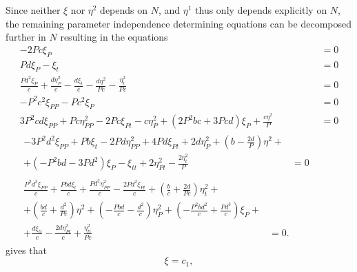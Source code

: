 Since neither \(\xi\) nor \(\eta^2\) depends on \(N\), and \(\eta^1\) thus only depends explicitly on \(N\), the remaining parameter independence determining equations  can be decomposed further in \(N\) resulting in the equations
\begin{subequations}
  \begin{align}
    - 2 P c \xi_{P} &= 0 \label{eq:lotka-volterra-det-aN-a}\\
    P d \xi_{P} - \xi_{t} &= 0 \label{eq:lotka-volterra-det-aN-b}\\
    \frac{P d^{2} \xi_{P}}{c} + \frac{d \eta^2_{P}}{c} - \frac{d \xi_{t}}{c} - \frac{d \eta^{2}}{P c} - \frac{\eta^2_{t}}{P c} &= 0 \label{eq:lotka-volterra-det-aN-c}\\
    - P^{2} c^{2} \xi_{PP} - P c^{2} \xi_{P} &= 0 \label{eq:lotka-volterra-det-aN-d}\\
    3 P^{2} c d \xi_{PP} + P c \eta^2_{PP} - 2 P c \xi_{Pt} - c \eta^2_{P} + \left(2 P^{2} b c + 3 P c d\right) \xi_{P} + \frac{c \eta^{2}}{P} &= 0 \label{eq:lotka-volterra-det-aN-e}\\
    \begin{split}\label{eq:lotka-volterra-det-aN-f}
      - 3 P^{2} d^{2} \xi_{PP} + P b \xi_{t} - 2 P d \eta^2_{PP} + 4 P d \xi_{Pt} + 2 d \eta^2_{P} + \left(b - \frac{2 d}{P}\right) \eta^{2} +&\\
      + \left(- P^{2} b d - 3 P d^{2}\right) \xi_{P} - \xi_{tt} + 2 \eta^2_{Pt} - \frac{2 \eta^2_{t}}{P} &= 0
    \end{split}\\
    \begin{split}\label{eq:lotka-volterra-det-aN-g}
      \frac{P^{2} d^{3} \xi_{PP}}{c} + \frac{P b d \xi_{t}}{c} + \frac{P d^{2} \eta^2_{PP}}{c} - \frac{2 P d^{2} \xi_{Pt}}{c} + \left(\frac{b}{c} + \frac{2 d}{P c}\right) \eta^2_{t} +&\\
      + \left(\frac{b d}{c} + \frac{d^{2}}{P c}\right) \eta^{2} + \left(- \frac{P b d}{c} - \frac{d^{2}}{c}\right) \eta^2_{P} + \left(- \frac{P^{2} b d^{2}}{c} + \frac{P d^{3}}{c}\right) \xi_{P} +&\\
      + \frac{d \xi_{tt}}{c} - \frac{2 d \eta^2_{Pt}}{c} + \frac{\eta^2_{tt}}{P c} &= 0.
    \end{split}
  \end{align}
\end{subequations}
 gives that
\begin{equation*}
  \xi = c_1,
\end{equation*}
